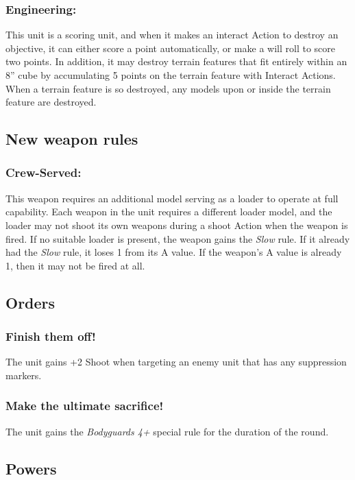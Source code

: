 \subsubsection*{Engineering:} This unit is a scoring unit, and when it makes an interact Action to destroy an objective, it can either score a point automatically, or make a will roll to score two points. In addition, it may destroy terrain features that fit entirely within an 8'' cube by accumulating 5 points on the terrain feature with Interact Actions. When a terrain feature is so destroyed, any models upon or inside the terrain feature are destroyed.

\subsection*{New weapon rules}

\subsubsection*{Crew-Served:} This weapon requires an additional model serving as a loader to operate at full capability. Each weapon in the unit requires a different loader model, and the loader may not shoot its own weapons during a shoot Action when the weapon is fired. If no suitable loader is present, the weapon gains the \textit{Slow} rule. If it already had the \textit{Slow} rule, it loses 1 from its A value. If the weapon's A value is already 1, then it may not be fired at all.

\subsection*{Orders}

\subsubsection*{Finish them off!} The unit gains +2 Shoot when targeting an enemy unit that has any suppression markers.

\subsubsection*{Make the ultimate sacrifice!} The unit gains the \textit{Bodyguards 4+} special rule for the duration of the round.


\subsection*{Powers}

